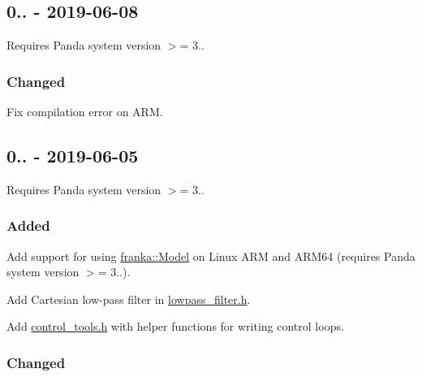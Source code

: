 \subsection*{0.. -\/ 2019-\/06-\/08}

Requires Panda system version $>$= 3..

\subsubsection*{Changed}


\begin{DoxyItemize}
\item Fix compilation error on A\+RM.
\end{DoxyItemize}

\subsection*{0.. -\/ 2019-\/06-\/05}

Requires Panda system version $>$= 3..

\subsubsection*{Added}


\begin{DoxyItemize}
\item Add support for using {\ttfamily \hyperlink{classfranka_1_1Model}{franka\+::\+Model}} on Linux A\+RM and A\+R\+M64 (requires Panda system version $>$= 3..).
\item Add Cartesian low-\/pass filter in {\ttfamily \hyperlink{lowpass__filter_8h}{lowpass\+\_\+filter.\+h}}.
\item Add {\ttfamily \hyperlink{control__tools_8h}{control\+\_\+tools.\+h}} with helper functions for writing control loops.
\end{DoxyItemize}

\subsubsection*{Changed}


